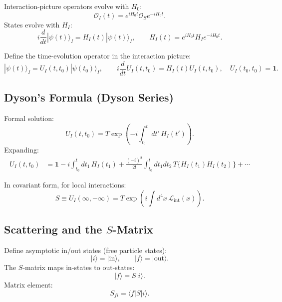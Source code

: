 Interaction-picture operators evolve with $H_0$:
\begin{equation}
\mathcal{O}_I(t)=e^{iH_0 t}\mathcal{O}_S e^{-iH_0 t}.
\end{equation}
States evolve with $H_I$:
\begin{equation}
i\frac{d}{dt}|\psi(t)\rangle_I = H_I(t)|\psi(t)\rangle_I,
\qquad
H_I(t)=e^{iH_0 t}H_I e^{-iH_0 t}.
\end{equation}

Define the time-evolution operator in the interaction picture:
\begin{equation}
|\psi(t)\rangle_I = U_I(t,t_0)|\psi(t_0)\rangle_I,
\qquad
i\frac{d}{dt}U_I(t,t_0)=H_I(t)U_I(t,t_0),
\quad U_I(t_0,t_0)=\mathbf{1}.
\end{equation}

\subsection{Dyson's Formula (Dyson Series)}
Formal solution:
\begin{equation}
U_I(t,t_0)=T\exp\left(-i\int_{t_0}^{t} dt'\,H_I(t')\right).
\end{equation}
Expanding:
\begin{align}
U_I(t,t_0)
&=\mathbf{1}
-i\int_{t_0}^{t} dt_1\,H_I(t_1)
+\frac{(-i)^2}{2!}\int_{t_0}^{t} dt_1dt_2\,T\{H_I(t_1)H_I(t_2)\}
+\cdots
\end{align}

In covariant form, for local interactions:
\begin{equation}
S \equiv U_I(\infty,-\infty)
=
T\exp\left(i\int d^4x\,\mathcal{L}_{\mathrm{int}}(x)\right).
\end{equation}

\subsection{Scattering and the $S$-Matrix}
Define asymptotic in/out states (free particle states):
\begin{equation}
|i\rangle = |\text{in}\rangle,
\qquad
|f\rangle = |\text{out}\rangle.
\end{equation}
The $S$-matrix maps in-states to out-states:
\begin{equation}
|f\rangle = S|i\rangle.
\end{equation}
Matrix element:
\begin{equation}
S_{fi}=\langle f|S|i\rangle.
\end{equation}


